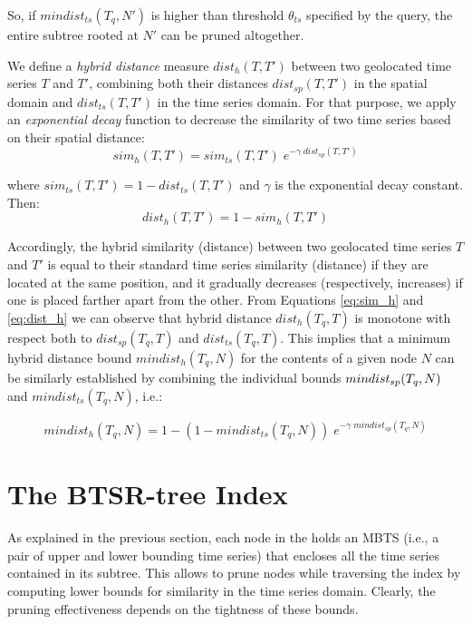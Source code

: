 \noindent So, if $mindist_{ts}(T_q, N')$ is higher than threshold $\theta_{ts}$ specified by the query, the entire subtree rooted at $N'$ can be pruned altogether.

We define a {\em hybrid distance} measure $dist_h(T, T')$ between two geolocated time series $T$ and $T'$, combining both their distances $dist_{sp}(T, T')$ in the spatial domain and $dist_{ts}(T, T')$ in the time series domain. For that purpose, we apply an {\em exponential decay} function to decrease the similarity of two time series based on their spatial distance:
\begin{equation}
 sim_h(T, T') = sim_{ts}(T, T') \; e^{- \gamma \; dist_{sp}(T, T')}
 \label{eq:sim_h}
\end{equation}

\noindent where $sim_{ts}(T, T') = 1 - dist_{ts}(T, T')$ and $\gamma$ is the exponential decay constant. Then:
\begin{equation}
 dist_h(T, T') = 1 - sim_h(T, T')
 \label{eq:dist_h}
\end{equation}

Accordingly, the hybrid similarity (distance) between two geolocated time series $T$ and $T'$ is equal to their standard time series similarity (distance) if they are located at the same position, and it gradually decreases (respectively, increases) if one is placed farther apart from the other. From Equations \ref{eq:sim_h} and \ref{eq:dist_h} we can observe that hybrid distance $dist_h(T_q, T)$ is monotone with respect both to $dist_{sp}(T_q, T)$ and $dist_{ts}(T_q, T)$. This implies that a minimum hybrid distance bound $mindist_h(T_q, N)$ for the contents of a given node $N$ can be similarly established by combining the individual bounds $mindist_{sp}\\(T_q, N)$ and $mindist_{ts}(T_q, N)$, i.e.:

\begin{equation}
mindist_h(T_q, N) = 1 - (1 - mindist_{ts}(T_q, N)) \; e^{- \gamma \; mindist_{sp}(T_q, N)}
\end{equation}

\section{The BTSR-tree Index}
\label{sec:ctsrtree}

As explained in the previous section, each node in the \tsr holds an MBTS (i.e., a pair of upper and lower bounding time series) that encloses all the time series contained in its subtree. This allows to prune nodes while traversing the index by computing lower bounds for similarity in the time series domain. Clearly, the pruning effectiveness depends on the tightness of these bounds.

